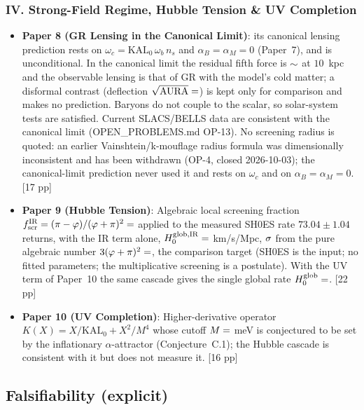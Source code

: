 \documentclass[11pt,a4paper]{article}
\begin{document}
\subsubsection*{IV. Strong-Field Regime, Hubble Tension \& UV Completion}
\begin{itemize}
  \item \textbf{Paper 8 (GR Lensing in the Canonical Limit)}: its canonical lensing prediction rests on $\omega_c=\mathrm{KAL}_0\,\omega_b\,n_s$ and $\alpha_B=\alpha_M=0$ (Paper~7), and is unconditional. In the canonical limit
  the residual fifth force is $\sim\val{quinta_fuerza_10kpc}$ at $10$~kpc and the observable lensing is that of GR with
  the model's cold matter; a disformal contrast (deflection $\sqrt{\text{AURA}}=\val{sqrt_AURA_d4}$) is kept
  only for comparison and makes no prediction. Baryons do not couple to the scalar, so
  solar-system tests are satisfied. Current SLACS/BELLS data are consistent with the
  canonical limit (OPEN\_PROBLEMS.md OP-13). No screening radius is
  quoted: an earlier Vainshtein/k-mouflage radius formula was dimensionally
  inconsistent and has been withdrawn (OP-4, closed 2026-10-03); the
  canonical-limit prediction never used it and rests on $\omega_c$ and on
  $\alpha_B=\alpha_M=0$. [17 pp]
  \item \textbf{Paper 9 (Hubble Tension)}: Algebraic local screening fraction
  $f_{\rm scr}^{\rm IR}=(\pi-\varphi)/(\varphi+\pi)^2=\val{F_SCREEN_IR_d6}$ applied to the
  measured SH0ES rate $73.04\pm1.04$ returns, with the IR term alone,
  $H_0^{\rm glob,IR}=\val{p9_sh0es_glob_IR}$ km/s/Mpc, $\val{p9_sh0es_sig_IR}\sigma$ from the pure algebraic number
  $3(\varphi+\pi)^2=\val{H0_ALG_d5}$, the comparison target (SH0ES is the
  input; no fitted parameters; the multiplicative screening is a postulate). With the
  UV term of Paper~10 the same cascade gives the single global rate
  $H_0^{\rm glob}=\val{H0_GLOBAL_d5}$. [22 pp]
  \item \textbf{Paper 10 (UV Completion)}: Higher-derivative operator
  $K(X)=X/\mathrm{KAL}_0+X^2/M^4$ whose cutoff $M=\val{M_meV_d2}$ meV is conjectured to be set by
  the inflationary $\alpha$-attractor (Conjecture~C.1); the Hubble cascade is consistent with
  it but does not measure it. [16 pp]
\end{itemize}

\subsection*{Falsifiability (explicit)}
\end{document}
